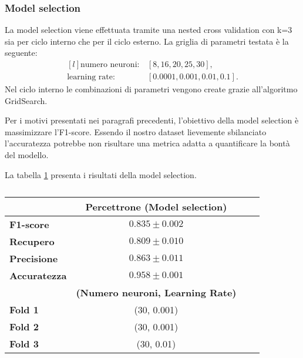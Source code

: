 \documentclass[../../main.tex]{subfiles}
\begin{document}
    \subsubsection{Model selection}

    La model selection viene effettuata tramite una nested cross validation con k=3 sia per ciclo interno che per il ciclo esterno. La griglia di parametri testata è la seguente:
    \[
    \begin{matrix*}[l]
        \text{numero neuroni}: & [8, 16, 20, 25, 30],\\
        \text{learning rate}: & [0.0001, 0.001, 0.01, 0.1].
    \end{matrix*}
    \]
    Nel ciclo interno le combinazioni di parametri vengono create grazie all'algoritmo GridSearch.

    Per i motivi presentati nei paragrafi precedenti, l'obiettivo della model selection è massimizzare l'F1-score. Essendo il nostro dataset lievemente sbilanciato l'accuratezza potrebbe non risultare una metrica adatta a quantificare la bontà del modello.
    

    La tabella \ref{tab:modelSelection} presenta i risultati della model selection. 
    \begin{table}[H]
        \centering                  
        \begin{tabular}{lccc}
            \toprule
            {}  &   \textbf{Percettrone (Model selection)}\\
            \midrule
            \textbf{F1-score }      &    $0.835 \pm 0.002$ \\
            \textbf{Recupero   }    &    $0.809 \pm 0.010$ \\
            \textbf{Precisione }    &    $0.863 \pm 0.011$ \\
            \textbf{Accuratezza }   &    $0.958 \pm 0.001$ \\
            \midrule
            {} & \textbf{(Numero neuroni, Learning Rate)}\\
            \midrule
            \textbf{Fold 1} &   (30, 0.001)\\ 
            \textbf{Fold 2} &   (30, 0.001)\\
            \textbf{Fold 3} &   (30, 0.01)\\
            \bottomrule
        \end{tabular}
        \caption{}
        \label{tab:modelSelection}
    \end{table}


    
\end{document}
